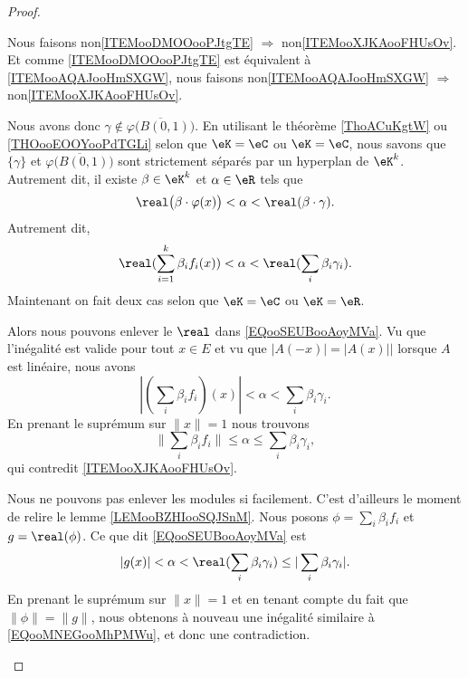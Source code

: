 \begin{proof}
\begin{subproof}
		\spitem[\ref{ITEMooXJKAooFHUsOv} \( \Rightarrow\) \ref{ITEMooDMOOooPJtgTE}]
		Nous faisons non\ref{ITEMooDMOOooPJtgTE} \( \Rightarrow\) non\ref{ITEMooXJKAooFHUsOv}. Et comme \ref{ITEMooDMOOooPJtgTE} est équivalent à \ref{ITEMooAQAJooHmSXGW}, nous faisons non\ref{ITEMooAQAJooHmSXGW} \( \Rightarrow\) non\ref{ITEMooXJKAooFHUsOv}.

		Nous avons donc \( \gamma\not\in\overline{\varphi\big( B(0,1) \big)}\). En utilisant le théorème \ref{ThoACuKgtW} ou \ref{THOooEOOYooPdTGLi} selon que \( \eK=\eC\) ou \( \eK=\eC\), nous savons que \( \{ \gamma \}\) et \( \overline{\varphi\big( B(0,1) \big)}\) sont strictement séparés par un hyperplan de \( \eK^k\). Autrement dit, il existe \( \beta\in \eK^k\) et \( \alpha\in \eR\) tels que
		\begin{equation}
			\real\big( \beta\cdot \varphi(x) \big)<\alpha<\real(\beta\cdot\gamma).
		\end{equation}
		Autrement dit,
		\begin{equation}		\label{EQooSEUBooAoyMVa}
			\real(\sum_{i=1}^k\beta_if_i(x))<\alpha<\real(\sum_i\beta_i\gamma_i).
		\end{equation}
		Maintenant on fait deux cas selon que \( \eK=\eC\) ou \( \eK=\eR\).
		\begin{subproof}
			\spitem[Si \( \eK=\eR\)]
			Alors nous pouvons enlever le \( \real\) dans \eqref{EQooSEUBooAoyMVa}. Vu que l'inégalité est valide pour tout \( x\in E\) et vu que \( | A(-x)|=| A(x) | |\) lorsque \( A\) est linéaire, nous avons
			\begin{equation}
				| (\sum_i\beta_if_i)(x) |<\alpha<\sum_i\beta_i\gamma_i.
			\end{equation}
			En prenant le suprémum sur \( \| x \|=1\) nous trouvons
			\begin{equation}		\label{EQooMNEGooMhPMWu}
				\| \sum_i\beta_if_i \|\leq\alpha\leq \sum_i\beta_i\gamma_i,
			\end{equation}
			qui contredit \ref{ITEMooXJKAooFHUsOv}.

			\spitem[Si \( \eK=\eC\)]
			Nous ne pouvons pas enlever les modules si facilement. C'est d'ailleurs le moment de relire le lemme \ref{LEMooBZHIooSQJSnM}. Nous posons \( \phi=\sum_i\beta_if_i\) et \( g=\real(\phi)\). Ce que dit \eqref{EQooSEUBooAoyMVa} est
			\begin{equation}
				| g(x) |<\alpha<\real(\sum_i\beta_i\gamma_i)\leq | \sum_i\beta_i\gamma_i |.
			\end{equation}
			En prenant le suprémum sur \( \| x \|=1\) et en tenant compte du fait que \( \| \phi \|=\| g \|\), nous obtenons à nouveau une inégalité similaire à \eqref{EQooMNEGooMhPMWu}, et donc une contradiction.
		\end{subproof}
	\end{subproof}
\end{proof}

